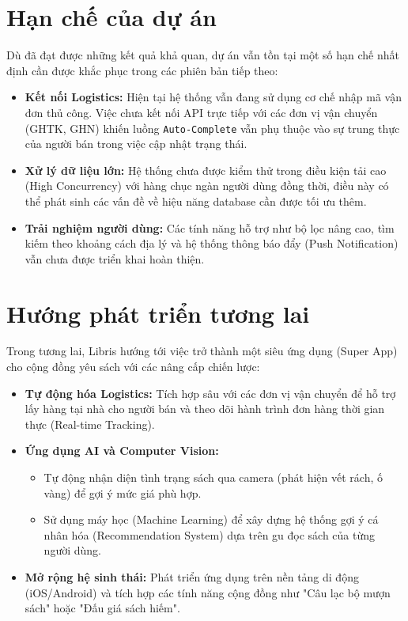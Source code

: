 \documentclass[../main.tex]{subfiles}
\begin{document}
\section{Hạn chế của dự án}
Dù đã đạt được những kết quả khả quan, dự án vẫn tồn tại một số hạn chế nhất định cần được khắc phục trong các phiên bản tiếp theo:
\begin{itemize}
    \item \textbf{Kết nối Logistics:} Hiện tại hệ thống vẫn đang sử dụng cơ chế nhập mã vận đơn thủ công. Việc chưa kết nối API trực tiếp với các đơn vị vận chuyển (GHTK, GHN) khiến luồng \texttt{Auto-Complete} vẫn phụ thuộc vào sự trung thực của người bán trong việc cập nhật trạng thái.
    \item \textbf{Xử lý dữ liệu lớn:} Hệ thống chưa được kiểm thử trong điều kiện tải cao (High Concurrency) với hàng chục ngàn người dùng đồng thời, điều này có thể phát sinh các vấn đề về hiệu năng database cần được tối ưu thêm.
    \item \textbf{Trải nghiệm người dùng:} Các tính năng hỗ trợ như bộ lọc nâng cao, tìm kiếm theo khoảng cách địa lý và hệ thống thông báo đẩy (Push Notification) vẫn chưa được triển khai hoàn thiện.
\end{itemize}

\section{Hướng phát triển tương lai}
Trong tương lai, Libris hướng tới việc trở thành một siêu ứng dụng (Super App) cho cộng đồng yêu sách với các nâng cấp chiến lược:
\begin{itemize}
    \item \textbf{Tự động hóa Logistics:} Tích hợp sâu với các đơn vị vận chuyển để hỗ trợ lấy hàng tại nhà cho người bán và theo dõi hành trình đơn hàng thời gian thực (Real-time Tracking).
    \item \textbf{Ứng dụng AI và Computer Vision:} 
    \begin{itemize}
        \item Tự động nhận diện tình trạng sách qua camera (phát hiện vết rách, ố vàng) để gợi ý mức giá phù hợp.
        \item Sử dụng máy học (Machine Learning) để xây dựng hệ thống gợi ý cá nhân hóa (Recommendation System) dựa trên gu đọc sách của từng người dùng.
    \end{itemize}
    \item \textbf{Mở rộng hệ sinh thái:} Phát triển ứng dụng trên nền tảng di động (iOS/Android) và tích hợp các tính năng cộng đồng như "Câu lạc bộ mượn sách" hoặc "Đấu giá sách hiếm".
\end{itemize}
\end{document}
